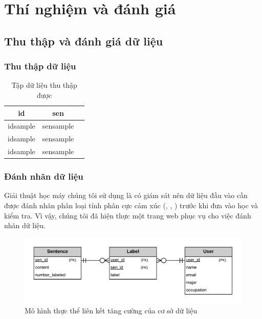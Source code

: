 \section{Thí nghiệm và đánh giá} \label{sec:thi-nghiem-va-danh-gia}
\subsection{Thu thập và đánh giá dữ liệu} \label{sec:thu-thap-va-danh-gia-du-lieu}
\subsubsection*{Thu thập dữ liệu}

\begin{table}[H]
\centering
\begin{minipage}{1.0\textwidth}
\caption{Tập dữ liệu thu thập được} 
\label{table:data}
\begin{tabular}{ |c|c|c| } 
 \hline
 id & sen \\ 
 \hline
 idsample & sensample \\ 
 idsample & sensample \\ 
 idsample & sensample \\ 
 \hline
\end{tabular}
\end{minipage}
\end{table}

\subsubsection*{Đánh nhãn dữ liệu}
Giải thuật học máy chúng tôi sử dụng là có giám sát nên dữ liệu đầu vào cần được đánh nhãn phân loại tính phân cực cảm xúc (\tichcuc, \tieucuc, \trungtinh) trước khi đưa vào học và kiểm tra. Vì vậy, chúng tôi đã hiện thực một trang web phục vụ cho việc đánh nhãn dữ liệu.\\

\begin{figure}[h]
\centering
\includegraphics[scale=0.25]{../hinh/EERD.png}
\caption{Mô hình thực thể liên kết tăng cường của cơ sở dữ liệu}
\label{fig:SQL}
\end{figure}

